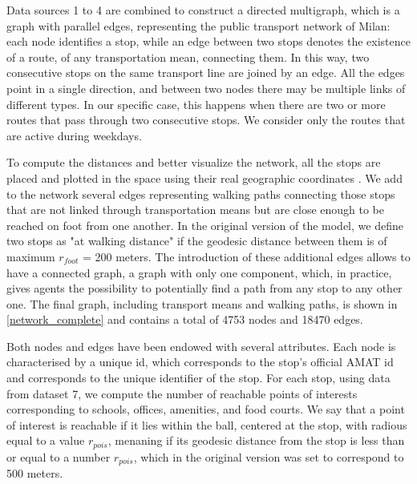 Data sources 1 to 4 are combined to construct a directed multigraph, which is a graph with parallel edges, representing the public transport network of Milan: each node identifies a stop, while an edge between two stops denotes the existence of a route, of any transportation mean, connecting them. In this way, two consecutive stops on the same transport line are joined by an edge. All the edges point in a single direction, and between two nodes there may be multiple links of different types. In our specific case, this happens when there are two or more routes that pass through two consecutive stops. We consider only the routes that are active during weekdays.

To compute the distances and better visualize the network, all the stops are placed and plotted in the space using their real geographic coordinates \cite{site2,site6}.  
We add to the network several edges representing walking paths connecting those stops that are not linked through transportation means but are close enough to be reached on foot from one another. In the original version of the model, we define two stops as "at walking distance" if the geodesic distance between them is of maximum $r_{foot}$ = 200 meters. The introduction of these additional edges allows to have a connected graph, a graph with only one component, which, in practice, gives agents the possibility to potentially find a path from any stop to any other one.
The final graph, including transport means and walking paths, is shown in \ref{network_complete} and contains a total of 4753 nodes and 18470 edges. 

Both nodes and edges have been endowed with several attributes.
Each node is characterised by a unique id, which corresponds to the stop's official AMAT id and corresponds to the unique identifier of the stop. For each stop, using data from dataset 7, we compute the number of reachable points of interests corresponding to schools, offices, amenities, and food courts. We say that a point of interest is reachable if it lies within the ball, centered at the stop, with radious equal to a value $r_{pois}$, menaning if its geodesic distance from the stop is less than or equal to a number $r_{pois}$, which in the original version was set to correspond to 500 meters.  
 
